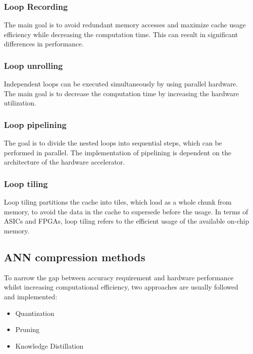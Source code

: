\subsubsection{Loop Recording}
The main goal is to avoid redundant memory accesses and maximize cache usage efficiency while decreasing the computation time\cite{CnnFpgaSurvey2, CnnAdvances}. This can result in significant differences in performance\cite{CnnAdvances}.

\subsubsection{Loop unrolling}
Independent loops can be executed simultaneously by using parallel hardware. The main goal is to decrease the computation time by increasing the hardware utilization\cite{CnnFpgaSurvey2, CnnAdvances}.

\subsubsection{Loop pipelining}
The goal is to divide the nested loops into sequential steps, which can be performed in parallel\cite{CnnAdvances}. The implementation of pipelining is dependent on the architecture of the hardware accelerator.

\subsubsection{Loop tiling}
Loop tiling partitions the cache into tiles, which load as a whole chunk from memory, to avoid the data in the cache to supersede before the usage\cite{CnnAdvances}. In terms of ASICs and FPGAs, loop tiling refers to the efficient usage of the available on-chip memory.

\subsection{ANN compression methods}
To narrow the gap between accuracy requirement and hardware performance whilst increasing computational efficiency, two approaches are usually followed and implemented:
\begin{itemize}
    \item Quantization
    \item Pruning
    \item Knowledge Distillation
\end{itemize}

